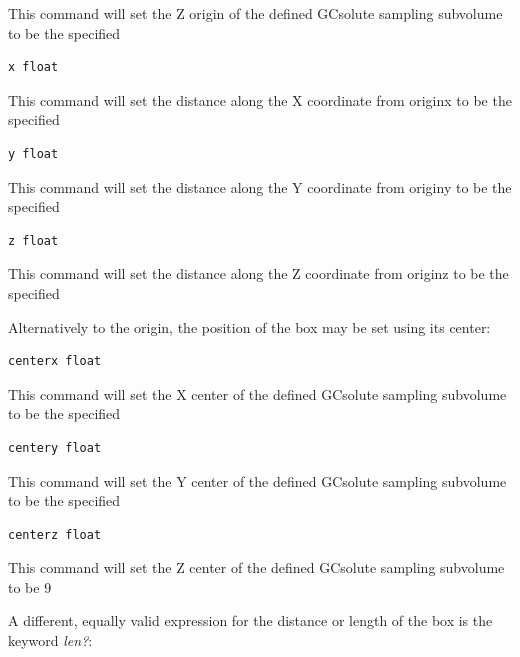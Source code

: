\documentclass[letterpaper,10pt,english]{sphinxmanual}
\begin{document}
This command will set the Z origin of the defined GCsolute sampling subvolume to be the specified 

\begin{Verbatim}[frame=single,commandchars=\\\{\}]
x float
\end{Verbatim}

This command will set the distance along the X coordinate from originx to be the specified 

\begin{Verbatim}[frame=single,commandchars=\\\{\}]
y float
\end{Verbatim}

This command will set the distance along the Y coordinate from originy to be the specified 

\begin{Verbatim}[frame=single,commandchars=\\\{\}]
z float
\end{Verbatim}

This command will set the distance along the Z coordinate from originz to be the specified 

Alternatively to the origin, the position of the box may be set using its center:

\begin{Verbatim}[frame=single,commandchars=\\\{\}]
centerx float
\end{Verbatim}

This command will set the X center of the defined GCsolute sampling subvolume to be the specified 

\begin{Verbatim}[frame=single,commandchars=\\\{\}]
centery float
\end{Verbatim}

This command will set the Y center of the defined GCsolute sampling subvolume to be the specified 

\begin{Verbatim}[frame=single,commandchars=\\\{\}]
centerz float
\end{Verbatim}

This command will set the Z center of the defined GCsolute sampling subvolume to be 9

A different, equally valid expression for the distance or length of the box is the keyword \emph{len?}:
\end{document}
